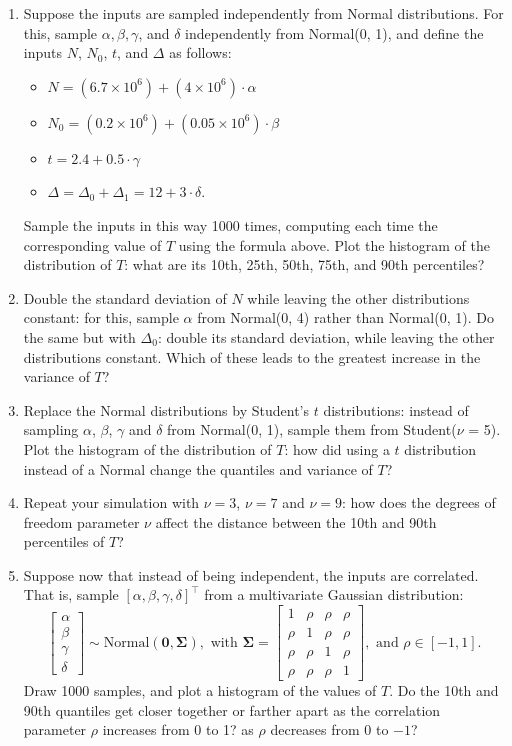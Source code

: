 \documentclass[11pt]{article}
\begin{document}
\begin{enumerate}
	\item Suppose the inputs are sampled independently from Normal distributions. For this, sample $\alpha, \beta, \gamma$, and $\delta$ independently from Normal(0, 1), and define the inputs $N$, $N_0$, $t$, and $\Delta$ as follows:
	\begin{itemize}
		\item $N = (6.7 \times 10^6) + (4 \times 10^6) \cdot \alpha$ 
		\item $N_0 = (0.2 \times 10^6) + (0.05 \times 10^6) \cdot \beta$
		\item $t = 2.4 + 0.5 \cdot \gamma$
		\item $\Delta = \Delta_0 + \Delta_1 = 12 + 3 \cdot \delta$.
	\end{itemize}
	Sample the inputs in this way 1000 times, computing each time the corresponding value of $T$ using the formula above. Plot the histogram of the distribution of $T$: what are its 10th, 25th, 50th, 75th, and 90th percentiles?
	\item Double the standard deviation of $N$ while leaving the other distributions constant: for this, sample $\alpha$ from Normal(0, 4) rather than Normal(0, 1). Do the same but with $\Delta_0$: double its standard deviation, while leaving the other distributions constant. Which of these leads to the greatest increase in the variance of $T$?
	\item Replace the Normal distributions by Student's $t$ distributions: instead of sampling $\alpha$, $\beta$, $\gamma$ and $\delta$ from Normal(0, 1), sample them from Student($\nu$ = 5). Plot the histogram of the distribution of $T$: how did using a $t$ distribution instead of a Normal change the quantiles and variance of $T$? 
	\item Repeat your simulation with $\nu = 3$, $\nu = 7$ and $\nu = 9$: how does the degrees of freedom parameter $\nu$ affect the distance between the 10th and 90th percentiles of $T$?
	\item Suppose now that instead of being independent, the inputs are correlated. That is, sample $[\alpha, \beta, \gamma, \delta]^\top$ from a multivariate Gaussian distribution: 
		$$
		\begin{bmatrix}
			\alpha\\
			\beta\\
			\gamma\\
			\delta	
		\end{bmatrix} \sim \text{Normal}(\mathbf{0}, \mathbf{\Sigma}),
		\text{ with }
		\mathbf{\Sigma} = \begin{bmatrix}
				1 & \rho & \rho & \rho\\
				\rho & 1 & \rho & \rho\\
				\rho & \rho & 1 & \rho\\
				\rho & \rho & \rho & 1
			\end{bmatrix},
		\text{ and } \rho \in [-1, 1].
		$$
	Draw 1000 samples, and plot a histogram of the values of $T$. Do the 10th and 90th quantiles get closer together or farther apart as the correlation parameter $\rho$ increases from 0 to 1? as $\rho$ decreases from 0 to $-1$?
\end{enumerate}
\end{document}
